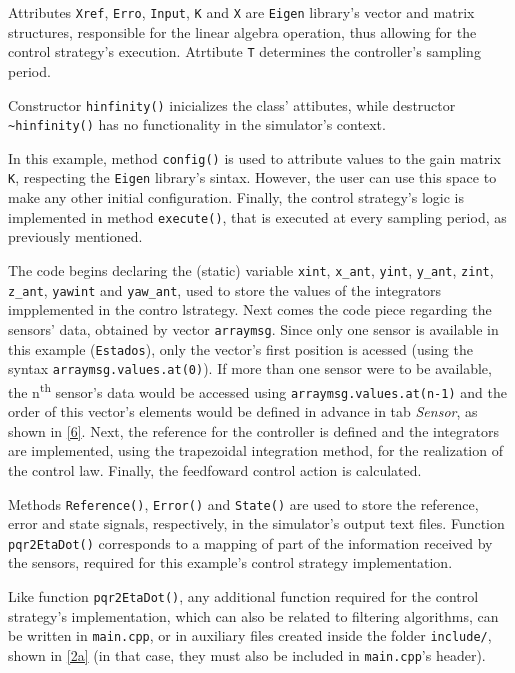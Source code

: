 Attributes \texttt{Xref}, \texttt{Erro}, \texttt{Input}, \texttt{K} and \texttt{X} are \texttt{Eigen} library's vector and matrix structures, responsible for the linear algebra operation, thus allowing for the control strategy's execution. Atrtibute \texttt{T} determines the controller's sampling period.

Constructor \texttt{hinfinity()} inicializes the class' attibutes, while destructor \texttt{\textasciitilde hinfinity()} has no functionality in the simulator's context.

In this example, method \texttt{config()} is used to attribute values to the gain matrix \texttt K, respecting the \texttt{Eigen} library's sintax. However, the user can use this space to make any other initial configuration. Finally, the control strategy's logic is implemented in method \texttt{execute()}, that is executed at every sampling period, as previously mentioned.

The code begins declaring the (static) variable \texttt{xint}, \texttt{x\_ant}, \texttt{yint}, \texttt{y\_ant}, \texttt{zint}, \texttt{z\_ant}, \texttt{yawint} and \texttt{yaw\_ant}, used to store the values of the integrators impplemented in the contro lstrategy. Next comes the code piece regarding the sensors' data, obtained by vector \texttt{arraymsg}. Since only one sensor is available in this example (\texttt{Estados}), only the vector's first position is acessed (using the syntax \texttt{arraymsg.values.at(0)}). If more than one sensor were to be available, the n\textsuperscript{th} sensor's data would be accessed using \texttt{arraymsg.values.at(n-1)} and the order of this vector's elements would be defined in advance in tab \textit{Sensor}, as shown in \ref{6}. Next, the reference for the controller is defined and the integrators are implemented, using the trapezoidal integration method, for the realization of the control law. Finally, the feedfoward control action is calculated.

Methods \texttt{Reference()}, \texttt{Error()} and \texttt{State()} are used to store the reference, error and state signals, respectively, in the simulator's output text files. Function \texttt{pqr2EtaDot()} corresponds to a mapping of part of the information received by the sensors, required for this example's control strategy implementation.

Like function \texttt{pqr2EtaDot()}, any additional function required for the control strategy's implementation, which can also be related to filtering algorithms, can be written in \texttt{main.cpp}, or in auxiliary files created inside the folder \texttt{include/}, shown in \ref{2a} (in that case, they must also be included in \texttt{main.cpp}'s header).

